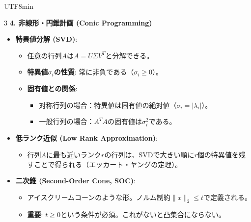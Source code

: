 \documentclass[8pt,a4paper]{article}
\begin{document}
\begin{CJK}{UTF8}{min}
\begin{multicols}{3}
\textbf{4. 非線形・円錐計画 (Conic Programming)}
\begin{itemize}
    \item \textbf{特異値分解 (SVD)}:
    \begin{itemize}
        \item 任意の行列$A$は$A = U \Sigma V^T$と分解できる。
        \item \textbf{特異値$\sigma_i$の性質}: 常に非負である（$\sigma_i \geq 0$）。
        \item \textbf{固有値との関係}:
        \begin{itemize}
            \item 対称行列の場合：特異値は固有値の絶対値（$\sigma_i = |\lambda_i|$）。
            \item 一般行列の場合：$A^T A$の固有値は$\sigma_i^2$である。
        \end{itemize}
    \end{itemize}
    \item \textbf{低ランク近似 (Low Rank Approximation)}:
    \begin{itemize}
        \item 行列$A$に最も近いランク$r$の行列は、SVDで大きい順に$r$個の特異値を残すことで得られる（エッカート・ヤングの定理）。
    \end{itemize}
    \item \textbf{二次錐 (Second-Order Cone, SOC)}:
    \begin{itemize}
        \item アイスクリームコーンのような形。ノルム制約$\|x\|_2 \leq t$で定義される。
        \item \textbf{重要}: $t \geq 0$という条件が必須。これがないと凸集合にならない。
    \end{itemize}
\end{itemize}


\end{multicols}
\end{CJK}
\end{document}
